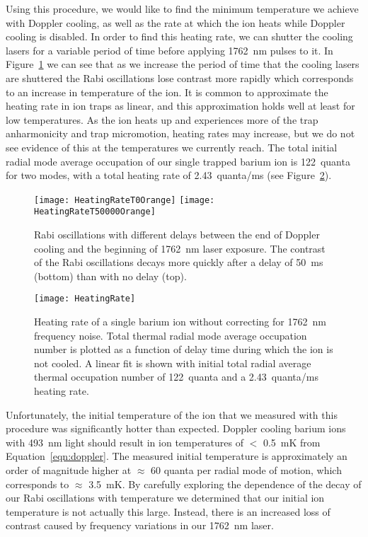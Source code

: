 Using this procedure, we would like to find the minimum temperature we achieve with Doppler cooling, as well as the rate at which the ion heats while Doppler cooling is disabled.  In order to find this heating rate, we can shutter the cooling lasers for a variable period of time before applying 1762~nm pulses to it.  In Figure~\ref{fig:rabi-heating} we can see that as we increase the period of time that the cooling lasers are shuttered the Rabi oscillations lose contrast more rapidly which corresponds to an increase in temperature of the ion.  It is common to approximate the heating rate in ion traps as linear, and this approximation holds well at least for low temperatures.  As the ion heats up and experiences more of the trap anharmonicity and trap micromotion, heating rates may increase, but we do not see evidence of this at the temperatures we currently reach.  The total initial radial mode average occupation of our single trapped barium ion is 122~quanta for two modes, with a total heating rate of 2.43~quanta/ms (see Figure~\ref{fig:heating-nonoise}).

\begin{figure}
	\centering
	\texttt{[image: HeatingRateT0Orange]}
	\texttt{[image: HeatingRateT50000Orange]}
	\caption[Rabi oscillations on the 1762~nm transition at different ion temperatures]{Rabi oscillations with different delays between the end of Doppler cooling and the beginning of 1762~nm laser exposure.  The contrast of the Rabi oscillations decays more quickly after a delay of 50~ms (bottom) than with no delay (top).}
	\label{fig:rabi-heating}
\end{figure}


\begin{figure}
	\centering
	\texttt{[image: HeatingRate]}
	\caption[Heating rate of single barium ion without 1762~nm noise correction]{Heating rate of a single barium ion without correcting for 1762~nm frequency noise.  Total thermal radial mode average occupation number is plotted as a function of delay time during which the ion is not cooled.  A linear fit is shown with initial total radial average thermal occupation number of 122~quanta and a 2.43~quanta/ms heating rate.}
	\label{fig:heating-nonoise}
\end{figure}

Unfortunately, the initial temperature of the ion that we measured with this procedure was significantly hotter than expected.  Doppler cooling barium ions with 493~nm light should result in ion temperatures of $<$ 0.5~mK from Equation~\ref{eqn:doppler}. The measured initial temperature is approximately an order of magnitude higher at $\approx$ 60 quanta per radial mode of motion, which corresponds to $\approx$ 3.5~mK.  By carefully exploring the dependence of the decay of our Rabi oscillations with temperature we determined that our initial ion temperature is not actually this large.  Instead, there is an increased loss of contrast caused by frequency variations in our 1762~nm laser.

